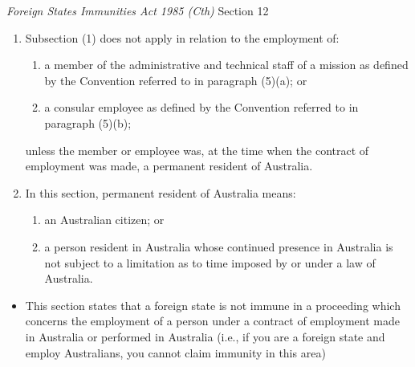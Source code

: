 \begin{statutedetails}{\textit{Foreign States Immunities Act 1985 (Cth)} Section 12}
\begin{enumerate}[label=(\arabic*)]
\begin{enumerate}
            \item a member of the diplomatic staff of a mission as defined by the Vienna Convention on Diplomatic Relations, being the Convention the English text of which is set out in the Schedule to the Diplomatic Privileges and Immunities Act 1967 ; or
            \item a consular officer as defined by the Vienna Convention on Consular Relations, being the Convention the English text of which is set out in the Schedule to the Consular Privileges and Immunities Act 1972 .
        \end{enumerate}
        \item Subsection (1) does not apply in relation to the employment of:
        \begin{enumerate}[label=(\alph*)]
            \item a member of the administrative and technical staff of a mission as defined by the Convention referred to in paragraph (5)(a); or
            \item a consular employee as defined by the Convention referred to in paragraph (5)(b);
        \end{enumerate}
        unless the member or employee was, at the time when the contract of employment was made, a permanent resident of Australia.
        \item In this section, permanent resident of Australia means:
        \begin{enumerate}
            \item an Australian citizen; or
            \item a person resident in Australia whose continued presence in Australia is not subject to a limitation as to time imposed by or under a law of Australia.
        \end{enumerate}
    \end{enumerate}
\end{statutedetails}

\begin{itemize}
    \item This section states that a foreign state is not immune in a proceeding which concerns the employment of a person under a contract of employment made in Australia or performed in Australia (i.e., if you are a foreign state and employ Australians, you cannot claim immunity in this area)
\end{itemize}

